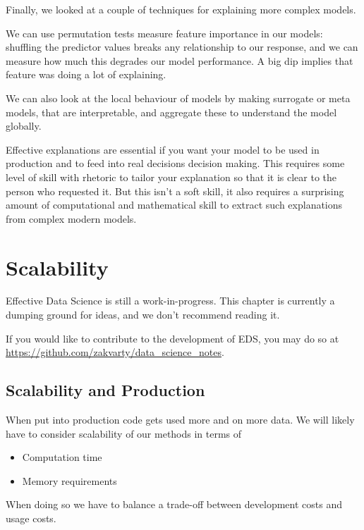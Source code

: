 \documentclass[
  12pt,
]{book}
\begin{document}
Finally, we looked at a couple of techniques for explaining more complex models.

We can use permutation tests measure feature importance in our models: shuffling the predictor values breaks any relationship to our response, and we can measure how much this degrades our model performance. A big dip implies that feature was doing a lot of explaining.

We can also look at the local behaviour of models by making surrogate or meta models, that are interpretable, and aggregate these to understand the model globally.

Effective explanations are essential if you want your model to be used in production and to feed into real decisions decision making. This requires some level of skill with rhetoric to tailor your explanation so that it is clear to the person who requested it. But this isn't a soft skill, it also requires a surprising amount of computational and mathematical skill to extract such explanations from complex modern models.

\hypertarget{production-scalability}{%
\chapter{Scalability}\label{production-scalability}}

Effective Data Science is still a work-in-progress. This chapter is currently a dumping ground for ideas, and we don't recommend reading it.

If you would like to contribute to the development of EDS, you may do so at \url{https://github.com/zakvarty/data_science_notes}.

\hypertarget{scalability-and-production}{%
\section{Scalability and Production}\label{scalability-and-production}}

When put into production code gets used more and on more data. We will likely have to consider scalability of our methods in terms of

\begin{itemize}
\item
  Computation time
\item
  Memory requirements
\end{itemize}

When doing so we have to balance a trade-off between development costs and usage costs.
\end{document}
